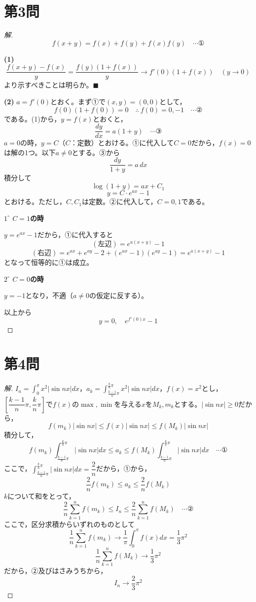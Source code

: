 \documentclass[../main.tex]{subfiles}
\begin{document}
\newpage

\section*{第3問}

\begin{proof}[解]
  \[
    f(x+y)=f(x)+f(y)+f(x)f(y) \quad\cdots\text{①}
  \]

  \textbf{(1)}
  \[
    \frac{f(x+y)-f(x)}{y}=\frac{f(y)(1+f(x))}{y}\longrightarrow f'(0)(1+f(x)) \quad(y\to0)
  \]
  より示すべきことは明らか。$\blacksquare$

  \textbf{(2)} $a=f'(0)$とおく。まず①で$(x,y)=(0,0)$として，
  \[
    f(0)(1+f(0))=0 \quad\therefore\ f(0)=0,-1 \quad\cdots\text{②}
  \]
  である。(1)から，$y=f(x)$とおくと，
  \[
    \frac{dy}{dx}=a(1+y) \quad\cdots\text{③}
  \]
  $a=0$の時，$y=C$（$C$：定数）とおける。①に代入して$C=0$だから，$f(x)=0$は解の1つ。以下$a\ne0$とする。③から
  \[
    \frac{dy}{1+y}=a\,dx
  \]
  積分して
  \[
    \log(1+y)=ax+C_1
  \]
  \[
    y=C\cdot e^{ax}-1
  \]
  とおける。ただし，$C,C_1$は定数。②に代入して，$C=0,1$である。

  \textbf{$1^\circ$ $C=1$の時}

  $y=e^{ax}-1$だから，①に代入すると
  \[
    (\text{左辺})=e^{a(x+y)}-1
  \]
  \[
    (\text{右辺})=e^{ax}+e^{ay}-2+(e^{ax}-1)(e^{ay}-1)=e^{a(x+y)}-1
  \]
  となって恒等的に①は成立。

  \textbf{$2^\circ$ $C=0$の時}

  $y=-1$となり，不適（$a\ne0$の仮定に反する）。

  以上から
  \[
    y=0,\quad e^{f'(0)x}-1
  \]
\end{proof}

\newpage

\section*{第4問}

\begin{proof}[解]
  $I_n=\displaystyle\int_0^\pi x^2|\sin nx|dx$，$a_k=\displaystyle\int_{\frac{k-1}{n}\pi}^{\frac{k}{n}\pi}x^2|\sin nx|dx$，$f(x)=x^2$とし，$\left[\dfrac{k-1}{n}\pi,\dfrac{k}{n}\pi\right]$で$f(x)$の$\max,\min$を与える$x$を$M_k,m_k$とする。$|\sin nx|\ge0$だから，
  \[
    f(m_k)|\sin nx|\le f(x)|\sin nx|\le f(M_k)|\sin nx|
  \]
  積分して，
  \[
    f(m_k)\int_{\frac{k-1}{n}\pi}^{\frac{k}{n}\pi}|\sin nx|dx\le a_k\le f(M_k)\int_{\frac{k-1}{n}\pi}^{\frac{k}{n}\pi}|\sin nx|dx \quad\cdots\text{①}
  \]
  ここで，$\displaystyle\int_{\frac{k-1}{n}\pi}^{\frac{k}{n}\pi}|\sin nx|dx=\dfrac2n$だから，①から，
  \[
    \frac2nf(m_k)\le a_k\le\frac2nf(M_k)
  \]
  $k$について和をとって，
  \[
    \frac2n\sum_{k=1}^nf(m_k)\le I_n\le\frac2n\sum_{k=1}^nf(M_k) \quad\cdots\text{②}
  \]
  ここで，区分求積からいずれのものとして
  \[
    \frac1n\sum_{k=1}^nf(m_k)\longrightarrow\frac1\pi\int_0^\pi f(x)dx=\frac13\pi^2
  \]
  \[
    \frac1n\sum_{k=1}^nf(M_k)\longrightarrow\frac13\pi^2
  \]
  だから，②及びはさみうちから，
  \[
    I_n\longrightarrow\frac23\pi^2
  \]
\end{proof}
\end{document}
